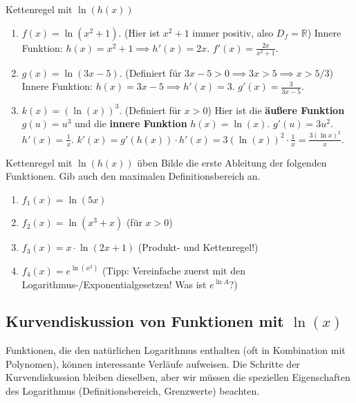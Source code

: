 \begin{beispielumgebung}{Kettenregel mit \texorpdfstring{$\ln(h(x))$}{ln(h(x))}}
\begin{enumerate}
    \item $f(x) = \ln(x^2+1)$. (Hier ist $x^2+1$ immer positiv, also $D_f=\mathbb{R}$)
        Innere Funktion: $h(x) = x^2+1 \implies h'(x) = 2x$.
        $f'(x) = \frac{2x}{x^2+1}$.

    \item $g(x) = \ln(3x-5)$. (Definiert für $3x-5 > 0 \implies 3x > 5 \implies x > 5/3$)
        Innere Funktion: $h(x) = 3x-5 \implies h'(x) = 3$.
        $g'(x) = \frac{3}{3x-5}$.

    \item $k(x) = ( \ln(x) )^3$. (Definiert für $x>0$)
        Hier ist die \textbf{äußere Funktion} $g(u)=u^3$ und die \textbf{innere Funktion} $h(x)=\ln(x)$.
        $g'(u) = 3u^2$.
        $h'(x) = \frac{1}{x}$.
        $k'(x) = g'(h(x)) \cdot h'(x) = 3(\ln(x))^2 \cdot \frac{1}{x} = \frac{3(\ln x)^2}{x}$.
\end{enumerate}
\end{beispielumgebung}

\begin{aufgabenumgebung}{Kettenregel mit \texorpdfstring{$\ln(h(x))$}{ln(h(x))} üben}
Bilde die erste Ableitung der folgenden Funktionen. Gib auch den maximalen Definitionsbereich an.
\begin{enumerate}
    \item $f_1(x) = \ln(5x)$
    \item $f_2(x) = \ln(x^3+x)$ (für $x>0$)
    \item $f_3(x) = x \cdot \ln(2x+1)$ (Produkt- und Kettenregel!)
    \item $f_4(x) = e^{\ln(x^2)}$ (Tipp: Vereinfache zuerst mit den Logarithmus-/Exponentialgesetzen! Was ist $e^{\ln A}$?)
\end{enumerate}
\end{aufgabenumgebung}

\subsection{Kurvendiskussion von Funktionen mit \texorpdfstring{$\ln(x)$}{ln(x)}}
\label{subsec:kurvendiskussion_lnx}

Funktionen, die den natürlichen Logarithmus enthalten (oft in Kombination mit Polynomen), können interessante Verläufe aufweisen. Die Schritte der Kurvendiskussion bleiben dieselben, aber wir müssen die speziellen Eigenschaften des Logarithmus (Definitionsbereich, Grenzwerte) beachten.


